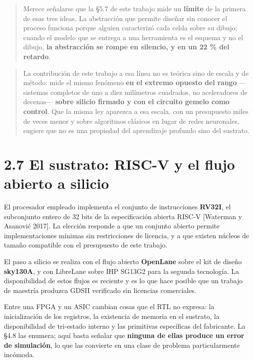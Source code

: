 \begin{quote}
Merece señalarse que la §5.7 de este trabajo mide un \textbf{límite} de
la primera de esas tres ideas. La abstracción que permite diseñar sin
conocer el proceso funciona porque alguien caracterizó cada celda sobre
su dibujo; cuando el modelo que se entrega a una herramienta es el
esquema y no el dibujo, \textbf{la abstracción se rompe en silencio, y
en un 22 \% del retardo}.
\end{quote}

\begin{quote}
La contribución de este trabajo a esa línea no es teórica sino de escala
y de método: mide el mismo fenómeno \textbf{en el extremo opuesto del
rango} ---sistemas completos de uno a diez milímetros cuadrados, no
aceleradores de decenas--- \textbf{sobre silicio firmado y con el
circuito gemelo como control}. Que la misma ley aparezca a esa escala,
con un presupuesto miles de veces menor y sobre algoritmos clásicos en
lugar de redes neuronales, sugiere que no es una propiedad del
aprendizaje profundo sino del sustrato.
\end{quote}

\section{2.7 El sustrato: RISC-V y el flujo abierto a
silicio}\label{el-sustrato-risc-v-y-el-flujo-abierto-a-silicio}

El procesador empleado implementa el conjunto de instrucciones
\textbf{RV32I}, el subconjunto entero de 32 bits de la especificación
abierta RISC-V {[}Waterman y Asanović 2017{]}. La elección responde a
que un conjunto abierto permite implementaciones mínimas sin
restricciones de licencia, y a que existen núcleos de tamaño compatible
con el presupuesto de este trabajo.

El paso a silicio se realiza con el flujo abierto \textbf{OpenLane}
sobre el kit de diseño \textbf{sky130A}, y con LibreLane sobre IHP
SG13G2 para la segunda tecnología. La disponibilidad de estos flujos es
reciente y es lo que hace posible que un trabajo de maestría produzca
GDSII verificado sin licencias comerciales.

Entre una FPGA y un ASIC cambian cosas que el RTL no expresa: la
inicialización de los registros, la existencia de memoria en el
sustrato, la disponibilidad de tri-estado interno y las primitivas
específicas del fabricante. La §4.8 las enumera; aquí basta señalar que
\textbf{ninguna de ellas produce un error de simulación}, lo que las
convierte en una clase de problema particularmente incómoda.

